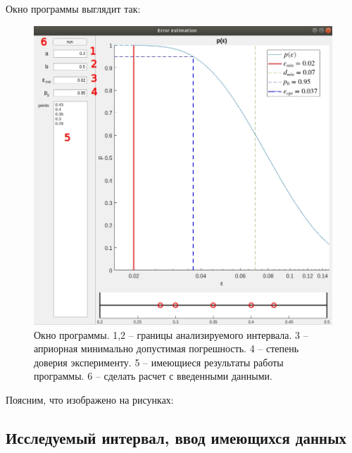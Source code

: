\documentclass[a4paper,12pt]{article} %
\begin{document}
Окно программы выглядит так:

\begin{figure}[h!]
\begin{center}
\includegraphics[width=1\textwidth]{./pics/whole_window_nums}
\end{center}
\caption{Окно программы. 1,2 -- границы анализируемого интервала. 3 -- априорная минимально допустимая погрешность. 4 -- степень доверия эксперименту. 5 -- имеющиеся результаты работы программы. 6 -- сделать расчет с введенными данными.} \label{img:whole_window}
\end{figure}

\newpage

Поясним, что изображено на рисунках:

\subsection{Исследуемый интервал, ввод имеющихся данных}
\end{document}
